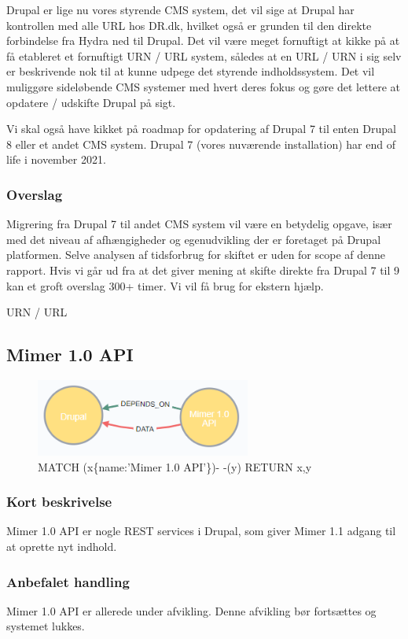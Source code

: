 \documentclass{article}
\begin{document}
Drupal er lige nu vores styrende CMS system, det vil sige at Drupal har kontrollen med alle URL hos DR.dk, hvilket også er grunden til den direkte forbindelse fra Hydra ned til Drupal. Det vil være meget fornuftigt at kikke på at få etableret et fornuftigt URN / URL system, således at en URL / URN i sig selv er beskrivende nok til at kunne udpege det styrende indholdssystem. Det vil muliggøre sideløbende CMS systemer med hvert deres fokus og gøre det lettere at opdatere / udskifte Drupal på sigt.
 
Vi skal også have kikket på roadmap for opdatering af Drupal 7 til enten Drupal 8 eller et andet CMS system. Drupal 7 (vores nuværende installation) har end of life i november 2021.
\subsubsection{Overslag}
Migrering fra Drupal 7 til andet CMS system vil være en betydelig opgave, især med det niveau af afhængigheder og egenudvikling der er foretaget på Drupal platformen. 
Selve analysen af tidsforbrug for skiftet er uden for scope af denne rapport. Hvis vi går ud fra at det giver mening at skifte direkte fra Drupal 7 til 9 kan et groft overslag 300+ timer. Vi vil få brug for ekstern hjælp.

URN / URL 


\subsection{Mimer 1.0 API}
\begin{figure}[h]
\includegraphics[width=200pt]{MimerAPI.PNG}
\caption{MATCH (x\{name:'Mimer 1.0 API'\})- -(y) RETURN x,y}
\end{figure}
\subsubsection{Kort beskrivelse}
Mimer 1.0 API er nogle REST services i Drupal, som giver Mimer 1.1 adgang til at oprette nyt indhold.
\subsubsection{Anbefalet handling}
Mimer 1.0 API er allerede under afvikling. Denne afvikling bør fortsættes og systemet lukkes.
\end{document}
